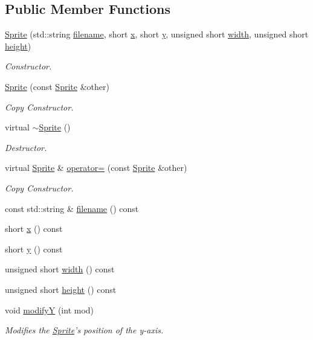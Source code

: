 \subsection*{Public Member Functions}
\begin{DoxyCompactItemize}
\item 
\hyperlink{classSprite_adf4666af1bdec5e29b921dfb60952671}{Sprite} (std\-::string \hyperlink{classSprite_aae3514a9a1f77ab5e8e213e44ec618a3}{filename}, short \hyperlink{classSprite_a18eb1c5b90418641d3eabda8f7fe56c9}{x}, short \hyperlink{classSprite_afca2c03aad9d2526427470688ae76439}{y}, unsigned short \hyperlink{classSprite_ac56c9242f797a1a2f76687fca636a3c4}{width}, unsigned short \hyperlink{classSprite_ae96d42c46af7aad1f9031da62f878b21}{height})
\begin{DoxyCompactList}\small\item\em Constructor. \end{DoxyCompactList}\item 
\hyperlink{classSprite_ac17f0e18a22c84234a659b1c0bbb69de}{Sprite} (const \hyperlink{classSprite}{Sprite} \&other)
\begin{DoxyCompactList}\small\item\em Copy Constructor. \end{DoxyCompactList}\item 
virtual \hyperlink{classSprite_a8accab430f9d90ae5117b57d67e32b84}{$\sim$\-Sprite} ()
\begin{DoxyCompactList}\small\item\em Destructor. \end{DoxyCompactList}\item 
virtual \hyperlink{classSprite}{Sprite} \& \hyperlink{classSprite_abb3f0673884d42b6b116f0c4d1a47b77}{operator=} (const \hyperlink{classSprite}{Sprite} \&other)
\begin{DoxyCompactList}\small\item\em Copy Constructor. \end{DoxyCompactList}\item 
const std\-::string \& \hyperlink{classSprite_aae3514a9a1f77ab5e8e213e44ec618a3}{filename} () const 
\item 
short \hyperlink{classSprite_a18eb1c5b90418641d3eabda8f7fe56c9}{x} () const 
\item 
short \hyperlink{classSprite_afca2c03aad9d2526427470688ae76439}{y} () const 
\item 
unsigned short \hyperlink{classSprite_ac56c9242f797a1a2f76687fca636a3c4}{width} () const 
\item 
unsigned short \hyperlink{classSprite_ae96d42c46af7aad1f9031da62f878b21}{height} () const 
\item 
void \hyperlink{classSprite_a587e5f7d415b1210ffeb091c69818914}{modify\-Y} (int mod)
\begin{DoxyCompactList}\small\item\em Modifies the \hyperlink{classSprite}{Sprite}'s position of the y-\/axis. \end{DoxyCompactList}\end{DoxyCompactItemize}
